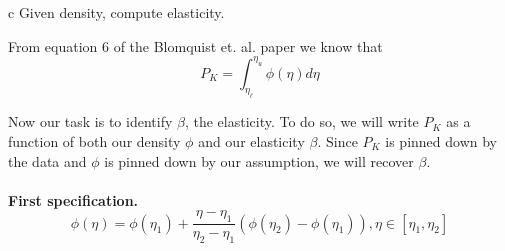 \documentclass{article}
\begin{document}
\begin{problem}{c}
Given density, compute elasticity.
\end{problem}
\begin{solution}

From equation 6 of the Blomquist et. al. paper we know that 
\[
P_{K}=\int_{\eta_{\ell}}^{\eta_{u}}\phi(\eta)d\eta
\]

Now our task is to identify $\beta$, the elasticity. To do so, we
will write $P_{K}$ as a function of both our density $\phi$ and
our elasticity $\beta$. Since $P_{K}$ is pinned down by the data
and $\phi$ is pinned down by our assumption, we will recover $\beta$. 

\paragraph{First specification.
\[
\ensuremath{\phi(\eta)=\phi\left(\eta_{1}\right)+\frac{\eta-\eta_{1}}{\eta_{2}-\eta_{1}}\left(\phi\left(\eta_{2}\right)-\phi\left(\eta_{1}\right)\right),\eta\in\left[\eta_{1},\eta_{2}\right]}
\]
}


\end{solution}
\end{document}
